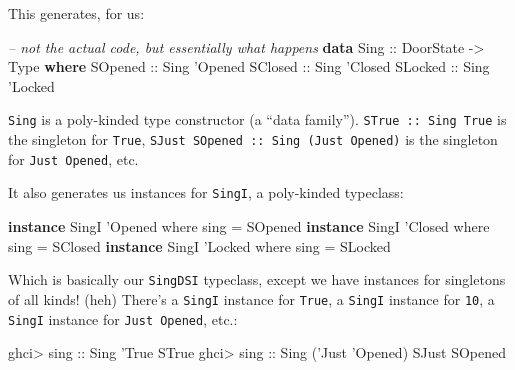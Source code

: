 \documentclass[]{article}
\newenvironment{Shaded}{\begin{snugshade}}{\end{snugshade}}
\newcommand{\CharTok}[1]{\textcolor[rgb]{0.31,0.60,0.02}{#1}}
\newcommand{\CommentTok}[1]{\textcolor[rgb]{0.56,0.35,0.01}{\textit{#1}}}
\newcommand{\DataTypeTok}[1]{\textcolor[rgb]{0.13,0.29,0.53}{#1}}
\newcommand{\FunctionTok}[1]{\textcolor[rgb]{0.00,0.00,0.00}{#1}}
\newcommand{\KeywordTok}[1]{\textcolor[rgb]{0.13,0.29,0.53}{\textbf{#1}}}
\newcommand{\NormalTok}[1]{#1}
\newcommand{\OtherTok}[1]{\textcolor[rgb]{0.56,0.35,0.01}{#1}}
\begin{document}
This generates, for us:

\begin{Shaded}
\begin{Highlighting}[]
\CommentTok{-- not the actual code, but essentially what happens}
\KeywordTok{data} \DataTypeTok{Sing}\OtherTok{ ::} \DataTypeTok{DoorState} \OtherTok{->} \DataTypeTok{Type} \KeywordTok{where}
    \DataTypeTok{SOpened}\OtherTok{ ::} \DataTypeTok{Sing} \CharTok{'Opened}
    \DataTypeTok{SClosed}\OtherTok{ ::} \DataTypeTok{Sing} \CharTok{'Closed}
    \DataTypeTok{SLocked}\OtherTok{ ::} \DataTypeTok{Sing} \CharTok{'Locked}
\end{Highlighting}
\end{Shaded}

\texttt{Sing} is a poly-kinded type constructor (a ``data family'').
\texttt{STrue\ ::\ Sing\ \textquotesingle{}True} is the singleton for
\texttt{\textquotesingle{}True},
\texttt{SJust\ SOpened\ ::\ Sing\ (\textquotesingle{}Just\ \textquotesingle{}Opened)}
is the singleton for \texttt{\textquotesingle{}Just\ \textquotesingle{}Opened},
etc.

It also generates us instances for \texttt{SingI}, a poly-kinded typeclass:

\begin{Shaded}
\begin{Highlighting}[]
\KeywordTok{instance} \DataTypeTok{SingI} \CharTok{'Opened where}
\NormalTok{    sing }\FunctionTok{=} \DataTypeTok{SOpened}
\KeywordTok{instance} \DataTypeTok{SingI} \CharTok{'Closed where}
\NormalTok{    sing }\FunctionTok{=} \DataTypeTok{SClosed}
\KeywordTok{instance} \DataTypeTok{SingI} \CharTok{'Locked where}
\NormalTok{    sing }\FunctionTok{=} \DataTypeTok{SLocked}
\end{Highlighting}
\end{Shaded}

Which is basically our \texttt{SingDSI} typeclass, except we have instances for
singletons of all kinds! (heh) There's a \texttt{SingI} instance for
\texttt{\textquotesingle{}True}, a \texttt{SingI} instance for \texttt{10}, a
\texttt{SingI} instance for
\texttt{\textquotesingle{}Just\ \textquotesingle{}Opened}, etc.:

\begin{Shaded}
\begin{Highlighting}[]
\NormalTok{ghci}\FunctionTok{>}\OtherTok{ sing ::} \DataTypeTok{Sing} \CharTok{'True}
\DataTypeTok{STrue}
\NormalTok{ghci}\FunctionTok{>}\OtherTok{ sing ::} \DataTypeTok{Sing}\NormalTok{ (}\CharTok{'Just '}\DataTypeTok{Opened}\NormalTok{)}
\DataTypeTok{SJust} \DataTypeTok{SOpened}
\end{Highlighting}
\end{Shaded}
\end{document}
